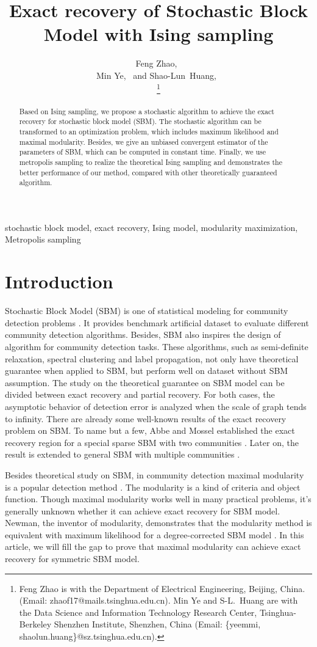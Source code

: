 \documentclass[journal]{IEEEtran}
\title{Exact recovery of Stochastic Block Model with Ising sampling}
\author{
	Feng Zhao,~\IEEEmembership{Student Member, IEEE}\\
	Min Ye,~\IEEEmembership{Member, IEEE} and
	Shao-Lun~Huang,~\IEEEmembership{Member, IEEE}\\
	\thanks{Feng Zhao is with the
		Department of Electrical Engineering, Beijing, China.
		(Email: zhaof17@mails.tsinghua.edu.cn).
		Min Ye and S-L.~Huang are with the Data Science and Information
		Technology Research Center, Tsinghua-Berkeley Shenzhen Institute,
		Shenzhen, China (Email: \{yeemmi, shaolun.huang\}@sz.tsinghua.edu.cn).
	}}
\newcommand{\1}{\mathbbm{1}}
\begin{document}
	\maketitle
\begin{abstract}
	Based on Ising sampling, we propose a stochastic algorithm to achieve the exact recovery for stochastic block model (SBM).
	The stochastic algorithm can be transformed to an optimization problem, which includes maximum likelihood and maximal modularity.
	Besides, we give an unbiased convergent estimator of the parameters of SBM, which can be computed in constant time.
	Finally, we use metropolis sampling to realize the theoretical Ising sampling and demonstrates the better performance of our method,
	compared with other theoretically guaranteed algorithm.
\end{abstract}
\begin{IEEEkeywords}
	stochastic block model, exact recovery, Ising model, modularity maximization, Metropolis sampling
\end{IEEEkeywords}
\section{Introduction}
Stochastic Block Model (SBM) is one of statistical modeling for community detection problems  \cite{holland1983stochastic, abbe2017community}.
It provides benchmark artificial dataset to evaluate different community detection algorithms.
Besides, SBM also inspires the design of algorithm for community detection tasks. These algorithms, such as
semi-definite relaxation, spectral clustering and label propagation, not only have theoretical guarantee when applied to SBM,
but perform well on dataset without SBM assumption. The study on the theoretical guarantee on SBM model can be divided between
exact recovery and partial recovery. For both cases, the asymptotic behavior of detection error
is analyzed when the scale of graph tends to infinity. There are already some well-known results of the exact recovery problem
on SBM.	To name but a few, Abbe and Mossel established the exact recovery region for a special sparse SBM with two communities  \cite{abbe2015exact, mossel2016}.
Later on, the result is extended to general SBM with multiple communities \cite{abbe2015community}.

Besides theoretical study on SBM, in community detection maximal modularity is a popular detection method \cite{Newman8577}.
The modularity is a kind of criteria and object function. Though maximal modularity works well in many practical problems, it's
generally unknown whether it can achieve exact recovery for SBM model. Newman, the inventor of modularity, demonstrates that
the modularity method is equivalent with maximum likelihood for a degree-corrected SBM model \cite{newman2016equivalence}. In this article,
we will fill the gap to prove that maximal modularity can achieve exact recovery for symmetric SBM model.
\end{document}
